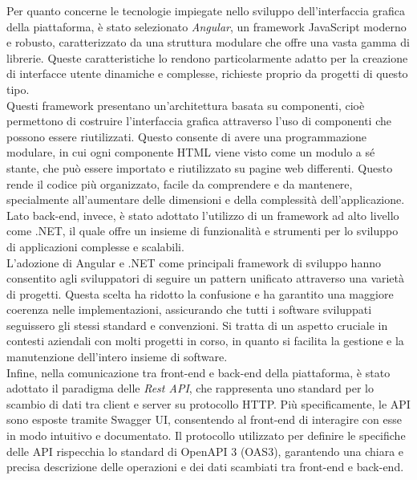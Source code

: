Per quanto concerne le tecnologie impiegate nello sviluppo dell'interfaccia grafica della piattaforma, è stato selezionato \textit{Angular}, un framework JavaScript moderno e robusto, caratterizzato da una struttura modulare che offre una vasta gamma di librerie. Queste caratteristiche lo rendono particolarmente adatto per la creazione di interfacce utente dinamiche e complesse, richieste proprio da progetti di questo tipo.
\\Questi framework presentano un'architettura basata su componenti, cioè permettono di costruire l'interfaccia grafica attraverso l'uso di componenti che possono essere riutilizzati. Questo consente di avere una programmazione modulare, in cui ogni componente HTML viene visto come un modulo a sé stante, che può essere importato e riutilizzato su pagine web differenti. Questo rende il codice più organizzato, facile da comprendere e da mantenere, specialmente all'aumentare delle dimensioni e della complessità dell'applicazione.
\\Lato back-end, invece, è stato adottato l'utilizzo di un framework ad alto livello come .NET, il quale offre un insieme di funzionalità e strumenti per lo sviluppo di applicazioni complesse e scalabili.
\\L'adozione di Angular e .NET come principali framework di sviluppo hanno consentito agli sviluppatori di seguire un pattern unificato attraverso una varietà di progetti. Questa scelta ha ridotto la confusione e ha garantito una maggiore coerenza nelle implementazioni, assicurando che tutti i software sviluppati seguissero gli stessi standard e convenzioni. Si tratta di un aspetto cruciale in contesti aziendali con molti progetti in corso, in quanto si facilita la gestione e la manutenzione dell'intero insieme di software.
\\Infine, nella comunicazione tra front-end e back-end della piattaforma, è stato adottato il paradigma delle \textit{Rest API}, che rappresenta uno standard per lo scambio di dati tra client e server su protocollo HTTP. Più specificamente, le API sono esposte tramite Swagger UI, consentendo al front-end di interagire con esse in modo intuitivo e documentato. Il protocollo utilizzato per definire le specifiche delle API rispecchia lo standard di OpenAPI 3 (OAS3), garantendo una chiara e precisa descrizione delle operazioni e dei dati scambiati tra front-end e back-end.


